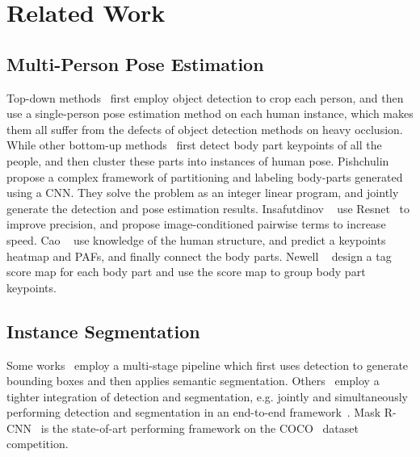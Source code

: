 \documentclass[10pt,twocolumn,letterpaper]{article}
\begin{document}
\section{Related Work}
\subsection{Multi-Person Pose Estimation}
Top-down methods~\cite{chen2017cascaded,fang2017rmpe,He2017Mask,huang2017coarse,papandreou2017towards} first employ object detection to crop each person, and then use a single-person pose estimation method on each human instance, which makes them all suffer from the defects of object detection methods on heavy occlusion.
While other bottom-up methods~\cite{cao2017realtime,insafutdinov2016deepercut,Newell2016Associative, rajchl2017deepcut} first detect body part keypoints of all the people, and then cluster these parts into instances of human pose.
Pishchulin \etal~\cite{rajchl2017deepcut} propose a complex framework of partitioning and labeling body-parts generated using a CNN. They solve the problem as an integer linear program, and jointly generate the detection and pose estimation results. Insafutdinov \etal~\cite{insafutdinov2016deepercut} use Resnet~\cite{he2016deep} to improve precision, and propose image-conditioned pairwise terms to increase speed. Cao \etal~\cite{cao2017realtime} use knowledge of the human structure, and predict a keypoints heatmap and PAFs, and finally connect the body parts. Newell \etal~\cite{Newell2016Associative} design a tag score map for each body part and use the score map to group body part keypoints.

\subsection{Instance Segmentation}
Some works~\cite{dai2015convolutional,girshick2015deformable,hariharan2014simultaneous,hariharan2015hypercolumns} employ a multi-stage pipeline which first uses detection to generate bounding boxes and then applies semantic segmentation. Others~\cite{dai2016instance,li2017fully,liu2017sgn,pinheiro2015learning} employ a tighter integration of detection and segmentation, e.g. jointly and  simultaneously performing detection and segmentation in an end-to-end framework~\cite{li2017fully}. Mask R-CNN~\cite{He2017Mask} is the state-of-art performing framework on the COCO~\cite{lin2014microsoft} dataset competition. 
\end{document}
